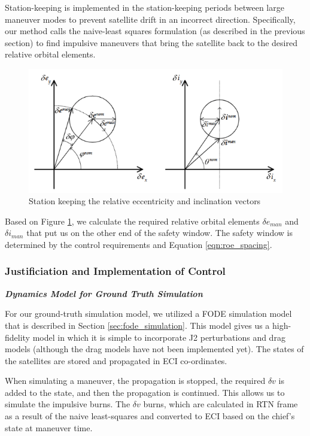 Station-keeping is implemented in the station-keeping periods between large maneuver modes to prevent satellite drift in an incorrect direction. Specifically, our method calls the naive-least squares formulation (as described in the previous section) to find impulsive maneuvers that bring the satellite back to the desired relative orbital elements.
\begin{figure}[H]
    \centering
    \includegraphics[width=0.75\linewidth]{sim//figures//PS5/station_keeping_man_damico.png}
    \caption{Station keeping the relative eccentricity and inclination vectors \cite{damicothesis}}
    \label{fig:station_keeping_guide}
\end{figure}

Based on Figure \ref{fig:station_keeping_guide}, we calculate the required relative orbital elements $\delta e_{man}$ and $\delta i_{man}$ that put us on the other end of the safety window. The safety window is determined by the control requirements and Equation \ref{eqn:roe_spacing}.

\subsubsection{Justificiation and Implementation of Control}

\textbf{\textit{Dynamics Model for Ground Truth Simulation}}

For our ground-truth simulation model, we utilized a FODE simulation model that is described in Section \ref{sec:fode_simulation}. This model gives us a high-fidelity model in which it is simple to incorporate J2 perturbations and drag models (although the drag models have not been implemented yet). The states of the satellites are stored and propagated in ECI co-ordinates. 

When simulating a maneuver, the propagation is stopped, the required $\delta v$ is added to the state, and then the propagation is continued. This allows us to simulate the impulsive burns. The $\delta v$ burns, which are calculated in RTN frame as a result of the naive least-squares and converted to ECI based on the chief's state at maneuver time.

